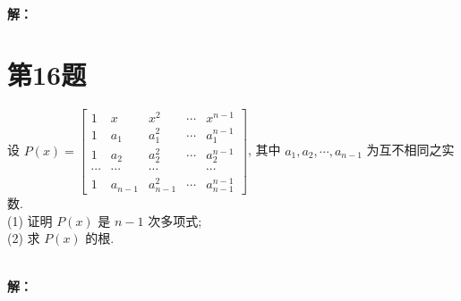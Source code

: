 \documentclass[a4paper, 12pt]{ctexart}
\begin{document}
\begin{exercise}
\end{exercise}~\\
\noindent\textbf{解：}


\section{第16题}
\begin{exercise}
设 $P(x) = \begin{bmatrix}
 1 &  x& x^{2}  & \cdots  &x^{n-1} \\
  1& a_{1} &  a_{1} ^{2}& \cdots &a_{1} ^{n-1}\\
 1 & a_{2} &  a_{2}^{2}& \cdots &a_{2}^{n-1} \\
 \cdots & \cdots &  \cdots &  & \cdots\\
 1 & a_{n-1} & a_{n-1}^{2} & \cdots &a_{n-1}^{n-1}
\end{bmatrix}$, 其中 $a_{1}, a_{2}, \cdots, a_{n-1}$ 为互不相同之实数.\\
(1) 证明 $P(x)$ 是 $n-1$ 次多项式;\\
(2) 求 $P(x)$ 的根.
\end{exercise}~\\
\noindent\textbf{解：}
\end{document}
